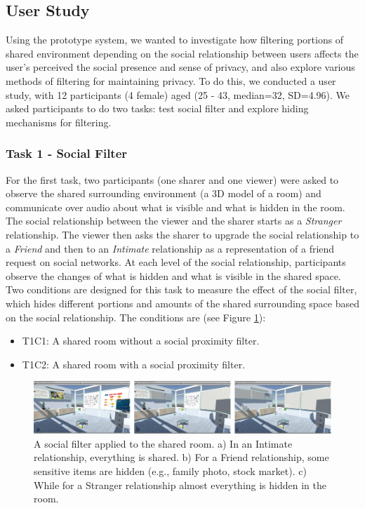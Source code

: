 \subsection{User Study}

Using the prototype system, we wanted to investigate how filtering portions of shared environment depending on the social relationship between users affects the user's perceived the social presence and sense of privacy, and also explore various methods of filtering for maintaining privacy. To do this, we conducted a user study, with 12 participants (4 female) aged (25 - 43, median=32, SD=4.96). 
We asked participants to do two tasks: test social filter and explore hiding mechanisms for filtering.

\subsubsection{Task 1 - Social Filter}

For the first task, two participants (one sharer and one viewer) were asked to observe the shared surrounding environment (a 3D model of a room) and communicate over audio about what is visible and what is hidden in the room. The social relationship between the viewer and the sharer starts as a \textit{Stranger} relationship. The viewer then asks the sharer to upgrade the social relationship to a \textit{Friend} and then to an \textit{Intimate} relationship as a representation of a friend request on social networks. At each level of the social relationship, participants observe the changes of what is hidden and what is visible in the shared space. Two conditions are designed for this task to measure the effect of the social filter, which hides different portions and amounts of the shared surrounding space based on the social relationship. The conditions are (see Figure \ref{fig:frontier18:social-filter}): 

\begin{itemize}
\item T1C1: A shared room without a social proximity filter.
\item T1C2: A shared room with a social proximity filter. 
\end{itemize}

\begin{figure}
    \begin{center}
    \includegraphics[width=\linewidth]{images/54-hiding-frontier18/images-02.png}
    \caption{A social filter applied to the shared room. a) In an Intimate relationship, everything is shared. b) For a Friend relationship, some sensitive items are hidden (e.g., family photo, stock market). c) While for a Stranger relationship almost everything is hidden in the room.}
    \label{fig:frontier18:social-filter}
    \end{center}
\end{figure}

